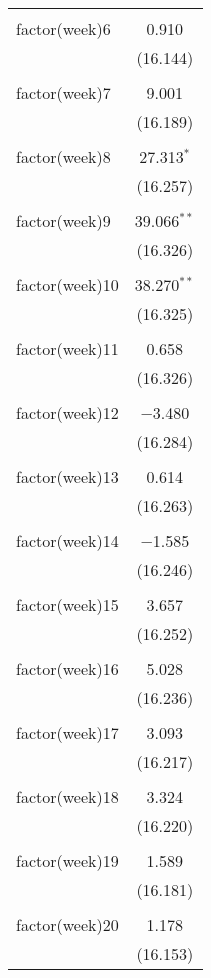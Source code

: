 \documentclass{article}
\begin{document}
\begin{table}[!htbp]
\begin{tabular}{@{\extracolsep{5pt}}lc}
  & \\ 
 factor(week)6 & 0.910 \\ 
  & (16.144) \\ 
  & \\ 
 factor(week)7 & 9.001 \\ 
  & (16.189) \\ 
  & \\ 
 factor(week)8 & 27.313$^{*}$ \\ 
  & (16.257) \\ 
  & \\ 
 factor(week)9 & 39.066$^{**}$ \\ 
  & (16.326) \\ 
  & \\ 
 factor(week)10 & 38.270$^{**}$ \\ 
  & (16.325) \\ 
  & \\ 
 factor(week)11 & 0.658 \\ 
  & (16.326) \\ 
  & \\ 
 factor(week)12 & $-$3.480 \\ 
  & (16.284) \\ 
  & \\ 
 factor(week)13 & 0.614 \\ 
  & (16.263) \\ 
  & \\ 
 factor(week)14 & $-$1.585 \\ 
  & (16.246) \\ 
  & \\ 
 factor(week)15 & 3.657 \\ 
  & (16.252) \\ 
  & \\ 
 factor(week)16 & 5.028 \\ 
  & (16.236) \\ 
  & \\ 
 factor(week)17 & 3.093 \\ 
  & (16.217) \\ 
  & \\ 
 factor(week)18 & 3.324 \\ 
  & (16.220) \\ 
  & \\ 
 factor(week)19 & 1.589 \\ 
  & (16.181) \\ 
  & \\ 
 factor(week)20 & 1.178 \\ 
  & (16.153) \\ 

\end{tabular}
\end{table}
\end{document}
